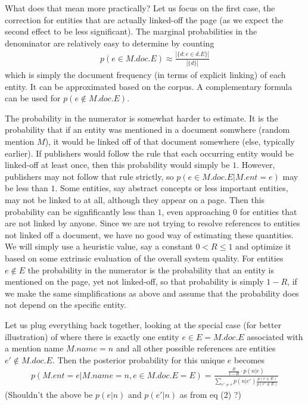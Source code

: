 \documentclass{article}
\begin{document}
What does that mean more practically? Let us focus on the first case, the correction for entities that are actually linked-off the page (as we expect the second effect to be less significant). The marginal probabilities in the denominator are relatively easy to determine by counting
\begin{align}
p(e \in M.doc.E) \approx \frac{|\{d: e \in d.E\}|}{|\{d\}|}
\end{align}
which is simply the document frequency (in terms of explicit linking) of each entity. It can be approximated based on the corpus. A complementary formula can be used for $p(e \not\in M.doc.E)$. 

The probability in the numerator is somewhat harder to estimate. It is the probability that if an entity was mentioned in a document somwhere (random mention $M$), it would be linked off of that document somewhere (else, typically earlier). If publishers would follow the rule that each occurring entity would be linked-off at least once, then this probability would simply be $1$. However, publishers may not follow that rule strictly, so $p(e \in M.doc.E | M.ent=e)$ may be less than $1$. Some entities, say abstract concepts or less important entities, may not be linked to at all, although they appear on a page. Then this probability can be signfificantly less than $1$, even approaching $0$ for entities that are not linked by anyone. Since we are not trying to resolve references to entities not linked off a document, we have no good way of estimating these quantities. We will simply use a heuristic value, say a constant $0 < R \leq 1$ and optimize it based on some extrinsic evaluation of the overall system quality. For entities $e \not\in E$ the probability in the numerator is the probability that an entity is mentioned on the page, yet not linked-off, so that probability is simply $1-R$, if we make the same simplifications as above and assume that the probability does not depend on the specific entity.   
 
Let us plug everything back together, looking at the special case (for better illustration) of where there is exactly one entity $e \in E = M.doc.E$ associated with a mention name $M.name=n$ and all other possible references are entities $e' \not\in M.doc.E$. Then the posterior probability for this unique $e$ becomes
\begin{align}
p(M.ent=e | M.name=n, e\in M.doc.E=E) =  \frac{\frac R{1-R} \cdot p(n|e)}{\sum_{e' \neq e} p(n|e') \frac{p(e \in E)}{p(e' \not\in E)}}
\label{eq:posterior-approx}
\end{align}
{\color{blue} (Shouldn't the above be $p(e|n)$ and $p(e'|n)$ as from eq (2) ?)}\\
\end{document}

